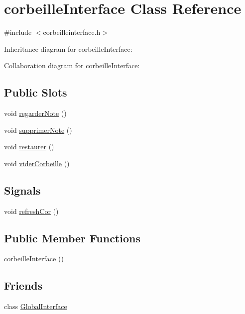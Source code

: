 \hypertarget{classcorbeilleInterface}{}\section{corbeille\+Interface Class Reference}
\label{classcorbeilleInterface}


{\ttfamily \#include $<$corbeilleinterface.\+h$>$}



Inheritance diagram for corbeille\+Interface\+:


Collaboration diagram for corbeille\+Interface\+:
\subsection*{Public Slots}
\begin{DoxyCompactItemize}
\item 
void \hyperlink{classcorbeilleInterface_a088e648ca32080265d8b3f8207bd6035}{regarder\+Note} ()
\item 
void \hyperlink{classcorbeilleInterface_a0eece804d5c33892ba0048f52a38fb9a}{supprimer\+Note} ()
\item 
void \hyperlink{classcorbeilleInterface_ace4a8e973165f5546ddb549685ab813c}{restaurer} ()
\item 
void \hyperlink{classcorbeilleInterface_aef6982cad10a369ebc636640353af683}{vider\+Corbeille} ()
\end{DoxyCompactItemize}
\subsection*{Signals}
\begin{DoxyCompactItemize}
\item 
void \hyperlink{classcorbeilleInterface_a6d260a87d91e4e55276489247e1f7275}{refresh\+Cor} ()
\end{DoxyCompactItemize}
\subsection*{Public Member Functions}
\begin{DoxyCompactItemize}
\item 
\hyperlink{classcorbeilleInterface_af487dbad8ace0cc6472f87caca573ed7}{corbeille\+Interface} ()
\end{DoxyCompactItemize}
\subsection*{Friends}
\begin{DoxyCompactItemize}
\item 
class \hyperlink{classcorbeilleInterface_a2250a78aa5cceb79c3e34da3f1fe0fde}{Global\+Interface}
\end{DoxyCompactItemize}


